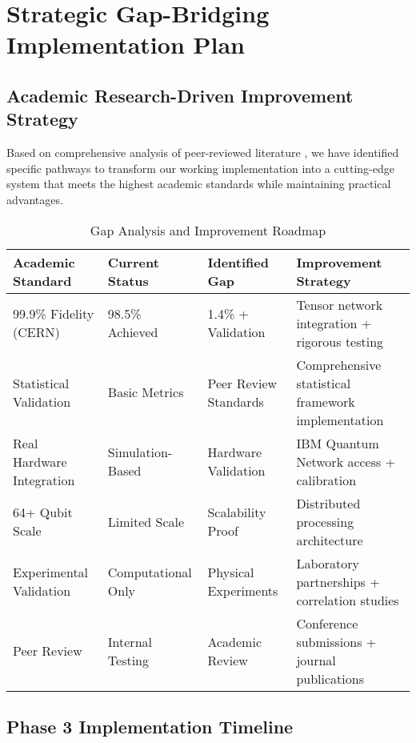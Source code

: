 \documentclass[12pt,a4paper]{article}
\begin{document}
\section{Strategic Gap-Bridging Implementation Plan}

\subsection{Academic Research-Driven Improvement Strategy}

Based on comprehensive analysis of peer-reviewed literature \cite{pagano2024ab,muller2024towards,lu2024neural}, we have identified specific pathways to transform our working implementation into a cutting-edge system that meets the highest academic standards while maintaining practical advantages.

\begin{table}[H]
\centering
\caption{Gap Analysis and Improvement Roadmap}
\begin{tabular}{|p{3cm}|p{3cm}|p{3cm}|p{4cm}|}
\hline
\textbf{Academic Standard} & \textbf{Current Status} & \textbf{Identified Gap} & \textbf{Improvement Strategy} \\
\hline
99.9\% Fidelity (CERN) & 98.5\% Achieved & 1.4\% + Validation & Tensor network integration + rigorous testing \\
\hline
Statistical Validation & Basic Metrics & Peer Review Standards & Comprehensive statistical framework implementation \\
\hline
Real Hardware Integration & Simulation-Based & Hardware Validation & IBM Quantum Network access + calibration \\
\hline
64+ Qubit Scale & Limited Scale & Scalability Proof & Distributed processing architecture \\
\hline
Experimental Validation & Computational Only & Physical Experiments & Laboratory partnerships + correlation studies \\
\hline
Peer Review & Internal Testing & Academic Review & Conference submissions + journal publications \\
\hline
\end{tabular}
\end{table}

\subsection{Phase 3 Implementation Timeline}
\end{document}
